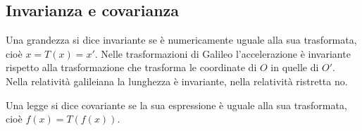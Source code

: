 \subsection{Invarianza e covarianza}
Una grandezza si dice invariante se è numericamente uguale alla sua trasformata, cioè $x=T(x)=x'$. Nelle trasformazioni di Galileo l'accelerazione è invariante rispetto alla trasformazione che trasforma le coordinate di $O$ in quelle di $O'$. Nella relatività galileiana la lunghezza è invariante, nella relatività ristretta no.

Una legge si dice covariante se la sua espressione è uguale alla sua trasformata, cioè $f(x)=T(f(x))$.